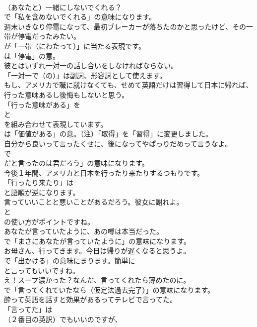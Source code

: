 \documentclass[8pt]{extreport}
\begin{document}
\begin{CJK}{UTF8}{min}
\\	（あなたと）一緒にしないでくれる？ 
\\	で「私を含めないでくれる」の意味になります。	
\\	週末いきなり停電になって、最初ブレーカーが落ちたのかと思ったけど、その一帯が停電だったみたい。 
\\	が「一帯（にわたって）」に当たる表現です。
\\	は「停電」の意。	
\\	彼とはいずれ一対一の話し合いをしなければならない。 
\\	「一対一で（の）」は副詞、形容詞として使えます。	
\\	もし、アメリカで職に就けなくても、せめて英語だけは習得して日本に帰れば、行った意味あるし後悔もしないと思う。 
\\	「行った意味がある」を 
\\	と
\\	を組み合わせて表現しています。
\\	は「価値がある」の意。（注）「取得」を「習得」に変更しました。	
\\	自分から良いって言ったくせに、後になってやぱっりだめって言うなよ。 
\\	で
\\	だと言ったのは君だろう」の意味になります。	
\\	今後１年間、アメリカと日本を行ったり来たりするつもりです。 
\\	「行ったり来たり」は 
\\	と語順が逆になります。	
\\	言っていいことと悪いことがあるだろう。彼女に謝れよ。 
\\	と
\\	の使い方がポイントですね。	
\\	あなたが言っていたように、あの噂は本当だった。 
\\	で「まさにあなたが言っていたように」の意味になります。	
\\	お母さん、行ってきます。今日は帰りが遅くなると思うよ。 
\\	で「出かける」の意味にまります。簡単に
\\	と言ってもいいですね。	
\\	え！スープ濃かった？なんだ、言ってくれたら薄めたのに。 
\\	で「言ってくれていたなら（仮定法過去完了）」の意味になります。	
\\	酔って英語を話すと効果があるってテレビで言ってた。 
\\	「言ってた」は
\\	（２番目の英訳）でもいいのですが、

\end{CJK}
\end{document}
